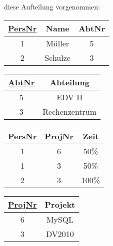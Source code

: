 \documentclass[9pt, a4paper]{scrartcl}
\begin{document}
diese Aufteilung vorgenommen:

\begin{multicols}{2}
\begin{center}
\begin{tabular}{|c|c|c|}\hline
	\rowcolor{ngb.tabelle.kopf.hg} \underline{PersNr} & Name & AbtNr \\\hline
	1 & Müller & 5 \\\hline
	2 & Schulze & 3 \\\hline
\end{tabular}
\end{center}

\begin{center}
\begin{tabular}{|c|c|}\hline
	\rowcolor{ngb.tabelle.kopf.hg} \underline{AbtNr} & Abteilung \\\hline
	5 & EDV II \\\hline
	3 & Rechenzentrum \\\hline
\end{tabular}
\end{center}

\begin{center}
\begin{tabular}{|c|c|c|}\hline
	\rowcolor{ngb.tabelle.kopf.hg} \underline{PersNr} & \underline{ProjNr} & Zeit \\\hline
	1 & 6 & 50\% \\\hline
	1 & 3 & 50\% \\\hline
	2 & 3 & 100\% \\\hline
\end{tabular}
\end{center}

\begin{center}
\begin{tabular}{|c|c|}\hline
	\rowcolor{ngb.tabelle.kopf.hg} \underline{ProjNr} & Projekt \\\hline
	6 & MySQL \\\hline
	3 & DV2010 \\\hline
\end{tabular}
\end{center}
\end{multicols}
\end{document}
